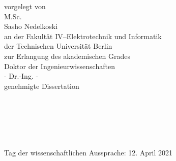 
\begin{titlepage}

\begin{addmargin}[-3cm]{-3cm}
\begin{center}
\large

\hfill
\vfill

\begingroup
\noindent\makebox[\linewidth]{\rule{\textwidth}{1pt}} 
\bigskip
\textbf{\color{Black}\spacedallcaps{\myTitle}}  
\bigskip %
\noindent\makebox[\linewidth]{\rule{\textwidth}{1pt}} 
\bigskip
\bigskip

vorgelegt von \\
M.Sc. \\
Sasho Nedelkoski\\
\bigskip
an der Fakultät IV--Elektrotechnik und Informatik \\
der Technischen Universität Berlin \\
zur Erlangung des akademischen Grades \\
\bigskip
Doktor der Ingenieurwissenschaften \\ 
- Dr.-Ing. - \\
genehmigte Dissertation
\vfill



\endgroup
\end{center}
\end{addmargin}


\large
\noindent\myReviewers \\
\newline
\myVorsitzender \\
\mySupervisor \\
\myProf \\
\myOtherProf
\newline\\
Tag der wissenschaftlichen Aussprache: 12. April 2021 
\bigskip

\begin{addmargin}[-3cm]{-3cm}
\begin{center}
\large\myLocation\myTime\
\end{center}
\end{addmargin}

\end{titlepage}